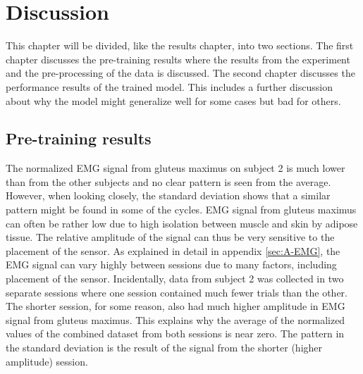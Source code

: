 \documentclass[../main.tex]{subfiles}
\begin{document}
\chapter{Discussion}
\label{sec:discussion}
This chapter will be divided, like the results chapter, into two sections. 
The first chapter discusses the pre-training results where the results from the experiment and the pre-processing of the data is discussed.
The second chapter discusses the performance results of the trained model.
This includes a further discussion about why the model might generalize well for some cases but bad for others.

\section{Pre-training results}
\label{sec:discussion_pre-training-results}

The normalized \ac{EMG} signal from gluteus maximus on subject 2 is much lower than from the other subjects and no clear pattern is seen from the average.
However, when looking closely, the standard deviation shows that a similar pattern might be found in some of the cycles.
\ac{EMG} signal from gluteus maximus can often be rather low due to high isolation between muscle and skin by adipose tissue.
The relative amplitude of the signal can thus be very sensitive to the placement of the sensor.
As explained in detail in appendix \ref{sec:A-EMG}, the \ac{EMG} signal can vary highly between sessions due to many factors, including placement of the sensor.
Incidentally, data from subject 2 was collected in two separate sessions where one session contained much fewer trials than the other.
The shorter session, for some reason, also had much higher amplitude in \ac{EMG} signal from gluteus maximus.
This explains why the average of the normalized values of the combined dataset from both sessions is near zero.
The pattern in the standard deviation is the result of the signal from the shorter (higher amplitude) session.
\end{document}
